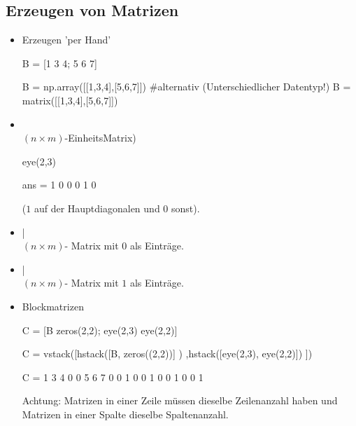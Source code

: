 \documentclass[hyperref={xetex}]{beamer}
\begin{document}
\subsection{Erzeugen von Matrizen}
%
%
\begin{frame}[fragile]{}
\begin{itemize}
\item Erzeugen 'per Hand'
\begin{matlabin}
B = [1 3 4; 5 6 7]
\end{matlabin}
\begin{pyin}
B = np.array([[1,3,4],[5,6,7]])
#alternativ (Unterschiedlicher Datentyp!)
B = matrix([[1,3,4],[5,6,7]]) 
\end{pyin}

\item {}\\ $(n \times m)$-EinheitsMatrix)
\begin{matlabin}
eye(2,3)
\end{matlabin}
\begin{matlab}
ans =
     1     0     0
     0     1     0 
\end{matlab}

($1$ auf der Hauptdiagonalen und 0 sonst).
\end{itemize}
\end{frame} 
%
%
\begin{frame}[fragile]{}
\begin{itemize}
\item {} |  \\$(n \times m)$- Matrix mit $0$ als Einträge.
\item {} |  \\$(n \times m)$- Matrix mit $1$ als Einträge.
\item Blockmatrizen
\begin{matlabin}
C = [B zeros(2,2); eye(2,3) eye(2,2)]
\end{matlabin}
\begin{pyin}
C = vstack([hstack([B, zeros((2,2))] ) ,hstack([eye(2,3), eye(2,2)]) ])
\end{pyin}
\begin{matlab}
C =
     1     3     4     0     0
     5     6     7     0     0
     1     0     0     1     0
     0     1     0     0     1 
\end{matlab}

\alert{Achtung:} Matrizen in einer Zeile müssen dieselbe
Zeilenanzahl haben und Matrizen in einer Spalte dieselbe Spaltenanzahl.
\end{itemize}
\end{frame} 
\end{document}
